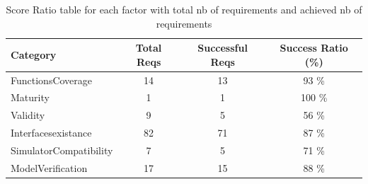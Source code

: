 \documentclass{article}
\begin{document}
						\begin{table}
						\centering
						\caption{Score Ratio table for each factor with total nb of requirements and achieved nb of requirements}
						\begin{tabular}{|l|c|c|c|}
						\hline
						Category & Total Reqs & Successful Reqs & Success Ratio (\%) \\
						\hline

							    FunctionsCoverage & 14 & 13 & 93 \% \\
							 

							    Maturity & 1 & 1 & 100 \% \\
							 

							    Validity & 9 & 5 & 56 \% \\
							 

							    Interfacesexistance & 82 & 71 & 87 \% \\
							 

							    SimulatorCompatibility & 7 & 5 & 71 \% \\
							 

							    ModelVerification & 17 & 15 & 88 \% \\
							 
					
						
						\hline
						\end{tabular}
						\end{table}




										
								

			
\end{document}

